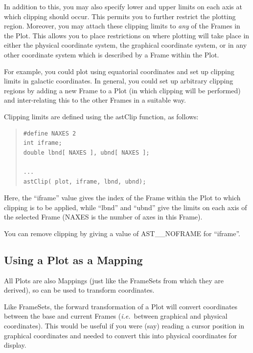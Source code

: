 \documentclass[twoside,11pt]{article}
\newcommand{\htmlref}[2]{#1}
\begin{document}
In addition to this, you may also specify lower and upper limits on
each axis at which clipping should occur. This permits you to further
restrict the plotting region. Moreover, you may attach these clipping
limits to {\em{any}} of the Frames in the Plot. This allows you to
place restrictions on where plotting will take place in either the
physical coordinate system, the graphical coordinate system, or in any
other coordinate system which is described by a \htmlref{Frame}{Frame} within the Plot.

For example, you could plot using equatorial coordinates and set up
clipping limits in galactic coordinates. In general, you could set up
arbitrary clipping regions by adding a new Frame to a Plot (in which
clipping will be performed) and inter-relating this to the other
Frames in a suitable way.

Clipping limits are defined using the \htmlref{astClip}{astClip} function, as follows:

\begin{quote}
\small
\begin{verbatim}
#define NAXES 2
int iframe;
double lbnd[ NAXES ], ubnd[ NAXES ];

...
astClip( plot, iframe, lbnd, ubnd);
\end{verbatim}
\normalsize
\end{quote}

Here, the ``iframe'' value gives the index of the Frame within the
Plot to which clipping is to be applied, while ``lbnd'' and ``ubnd''
give the limits on each axis of the selected Frame (NAXES is the
number of axes in this Frame).

You can remove clipping by giving a value of AST\_\_NOFRAME for ``iframe''.

\subsection{Using a Plot as a Mapping}

All Plots are also Mappings (just like the FrameSets from which they
are derived), so can be used to transform coordinates.

Like FrameSets, the forward transformation of a \htmlref{Plot}{Plot} will convert
coordinates between the base and current Frames ({\em{i.e.}}\ between
graphical and physical coordinates). This would be useful if you were
(say) reading a cursor position in graphical coordinates and needed to
convert this into physical coordinates for display.
\end{document}
